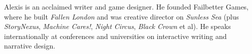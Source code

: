 Alexis is an acclaimed writer and game designer. He founded Failbetter Games, where he built \emph{Fallen London} and was creative director on \emph{Sunless Sea} (plus \emph{StoryNexus}, \emph{Machine Cares!}, \emph{Night Circus}, \emph{Black Crown} et al). He speaks internationally at conferences and universities on interactive writing and narrative design.
